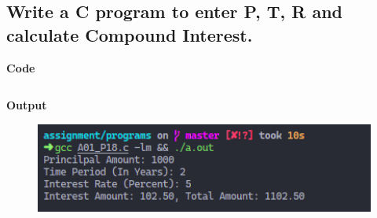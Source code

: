 \documentclass[a4paper]{article}
\begin{document}
\newpage



\subsection{Write a C program to enter P, T, R and calculate Compound Interest.}
\textbf{Code}

\inputminted{C}{programs/A01_P18.c}

\textbf{Output}

\begin{figure}[h]
  \includegraphics[width=12cm]{A01_P18}
\end{figure}

\newpage

\end{document}
